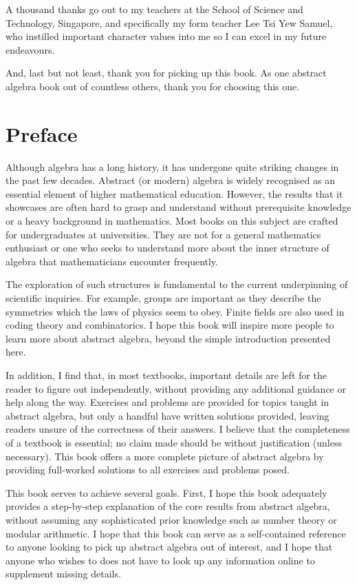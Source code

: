 A thousand thanks go out to my teachers at the School of Science and Technology, Singapore, and specifically my form teacher Lee Tsi Yew Samuel, who instilled important character values into me so I can excel in my future endeavours.

And, last but not least, thank you for picking up this book. As one abstract algebra book out of countless others, thank you for choosing this one.

\chapter{Preface}
Although algebra has a long history, it has undergone quite striking changes in the past few decades. Abstract (or modern) algebra is widely recognised as an essential element of higher mathematical education. However, the results that it showcases are often hard to grasp and understand without prerequisite knowledge or a heavy background in mathematics. Most books on this subject are crafted for undergraduates at universities. They are not for a general mathematics enthusiast or one who seeks to understand more about the inner structure of algebra that mathematicians encounter frequently.

The exploration of such structures is fundamental to the current underpinning of scientific inquiries. For example, groups are important as they describe the symmetries which the laws of physics seem to obey. Finite fields are also used in coding theory and combinatorics. I hope this book will inspire more people to learn more about abstract algebra, beyond the simple introduction presented here.

In addition, I find that, in most textbooks, important details are left for the reader to figure out independently, without providing any additional guidance or help along the way. Exercises and problems are provided for topics taught in abstract algebra, but only a handful have written solutions provided, leaving readers unsure of the correctness of their answers. I believe that the completeness of a textbook is essential; no claim made should be without justification (unless necessary). This book offers a more complete picture of abstract algebra by providing full-worked solutions to all exercises and problems posed.

This book serves to achieve several goals. First, I hope this book adequately provides a step-by-step explanation of the core results from abstract algebra, without assuming any sophisticated prior knowledge such as number theory or modular arithmetic. I hope that this book can serve as a self-contained reference to anyone looking to pick up abstract algebra out of interest, and I hope that anyone who wishes to does not have to look up any information online to supplement missing details.

